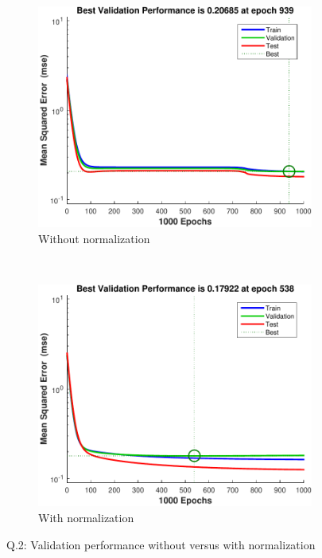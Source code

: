\documentclass[12pt, a4paper]{article}
\begin{document}
\begin{figure}[htbp]
		\centering
		\begin{subfigure}[b]{0.48\textwidth}
		        \includegraphics[width=\textwidth]{Q2-non-normalised}
		        \caption{Without normalization}
		\end{subfigure}
		~
		\begin{subfigure}[b]{0.48\textwidth}
		      \includegraphics[width=\textwidth]{Q2-normalised}
		      \caption{With normalization}
		\end{subfigure}
\caption{Q.2: Validation performance without versus with normalization}
\label{Q2}
\end{figure}
\end{document}
